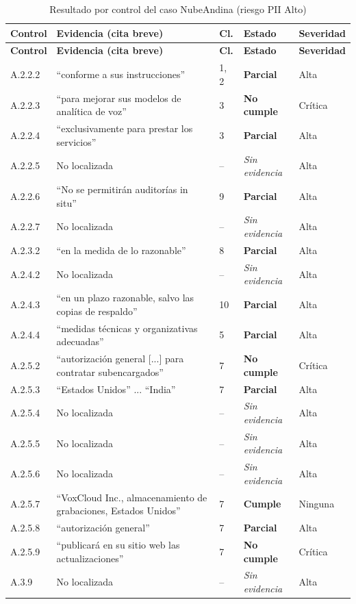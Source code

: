 \documentclass[12pt,letterpaper]{article}
\newcommand{\eC}{\textbf{Cumple}}
\newcommand{\eP}{\textbf{Parcial}}
\newcommand{\eNC}{\textbf{No cumple}}
\newcommand{\eSE}{\textit{Sin evidencia}}
\begin{document}
\begin{small}
\begin{longtable}{@{}l L{4.7cm} L{0.9cm} L{2.2cm} L{1.8cm}@{}}
\caption{Resultado por control del caso NubeAndina (riesgo PII Alto)}\label{tab:matriz}\\
\toprule
\textbf{Control} & \textbf{Evidencia (cita breve)} & \textbf{Cl.} & \textbf{Estado} & \textbf{Severidad} \\
\midrule
\endfirsthead
\toprule
\textbf{Control} & \textbf{Evidencia (cita breve)} & \textbf{Cl.} & \textbf{Estado} & \textbf{Severidad} \\
\midrule
\endhead
\bottomrule
\endfoot
A.2.2.2 & ``conforme a sus instrucciones'' & 1, 2 & \eP & Alta \\
A.2.2.3 & ``para mejorar sus modelos de analítica de voz'' & 3 & \eNC & Crítica \\
A.2.2.4 & ``exclusivamente para prestar los servicios'' & 3 & \eP & Alta \\
A.2.2.5 & No localizada & -- & \eSE & Alta \\
A.2.2.6 & ``No se permitirán auditorías in situ'' & 9 & \eP & Alta \\
A.2.2.7 & No localizada & -- & \eSE & Alta \\
A.2.3.2 & ``en la medida de lo razonable'' & 8 & \eP & Alta \\
A.2.4.2 & No localizada & -- & \eSE & Alta \\
A.2.4.3 & ``en un plazo razonable, salvo las copias de respaldo'' & 10 & \eP & Alta \\
A.2.4.4 & ``medidas técnicas y organizativas adecuadas'' & 5 & \eP & Alta \\
A.2.5.2 & ``autorización general [...] para contratar subencargados'' & 7 & \eNC & Crítica \\
A.2.5.3 & ``Estados Unidos'' ... ``India'' & 7 & \eP & Alta \\
A.2.5.4 & No localizada & -- & \eSE & Alta \\
A.2.5.5 & No localizada & -- & \eSE & Alta \\
A.2.5.6 & No localizada & -- & \eSE & Alta \\
A.2.5.7 & ``VoxCloud Inc., almacenamiento de grabaciones, Estados Unidos'' & 7 & \eC & Ninguna \\
A.2.5.8 & ``autorización general'' & 7 & \eP & Alta \\
A.2.5.9 & ``publicará en su sitio web las actualizaciones'' & 7 & \eNC & Crítica \\
A.3.9 & No localizada & -- & \eSE & Alta \\

\end{longtable}
\end{small}
\end{document}
